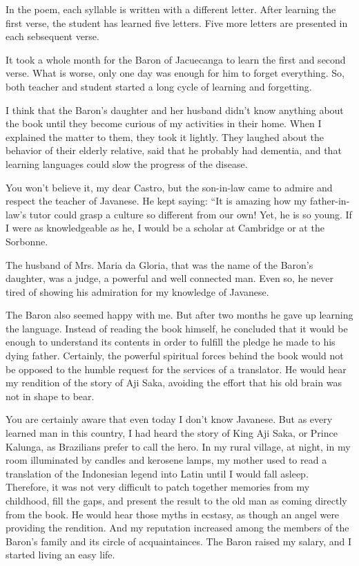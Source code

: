 \documentclass[a4paper,12pt]{book}
\begin{document}
In the poem, each syllable is written
with a different letter. After learning
the first verse, the student has learned
five letters.  Five more letters are
presented in each sebsequent verse. 

It took a whole month for the Baron of
Jacuecanga to learn the first and second
verse. What is worse, only one day was
enough for him to forget everything.
So, both teacher and student started a long
cycle of learning and forgetting.

I think that the Baron's daughter and her husband
didn't know anything about the book until they
become curious of my activities in their home.
When I explained the matter to them, they took it
lightly. They laughed about the behavior of their
elderly relative, said that he probably had dementia,
and that learning languages could slow the progress of
the disease. 

You won't believe it, my dear Castro, but the
son-in-law came to admire and respect the teacher
of Javanese. He kept saying: ``It is amazing how
my father-in-law's tutor could grasp a culture
so different from our own! Yet, he is
so young. If I were as knowledgeable as he,
I would be a scholar at Cambridge or at the Sorbonne.

The husband of Mrs. Maria da Gloria,
that was the name of the Baron's daughter,
was a judge, a powerful and well connected man.
Even so, he never tired of showing
his admiration for my knowledge of Javanese.

The Baron also seemed happy with me.
But after two months he gave up learning
the language. Instead of reading the book
himself, he concluded that it would be
enough to understand its contents
in order to fulfill the pledge he made to his
dying father. Certainly, the powerful
spiritual forces behind the book would
not be opposed to the humble request for
the services of a translator.
He would hear my rendition of the story of
Aji Saka, avoiding the effort that his
old brain was not in shape to bear.

You are certainly aware that even today
I don't know Javanese. But as every
learned man in this country, I had heard
the story of King Aji Saka, or Prince Kalunga,
as Brazilians prefer to call the hero.
In my rural village, at night,
in my room illuminated by candles and
kerosene lamps, my mother used to read
a translation of the Indonesian
legend into Latin until I would fall asleep.
Therefore, it was not very difficult to
patch together memories from my childhood,
fill the gaps, and present the result
to the old man as coming directly from the book.
He would hear those myths in ecstasy, as
though an angel were providing the rendition.
And my reputation
increased among the members of the Baron's
family and its circle of acquaintainces.
The Baron raised my salary, and I started
living an easy life.
\end{document}
